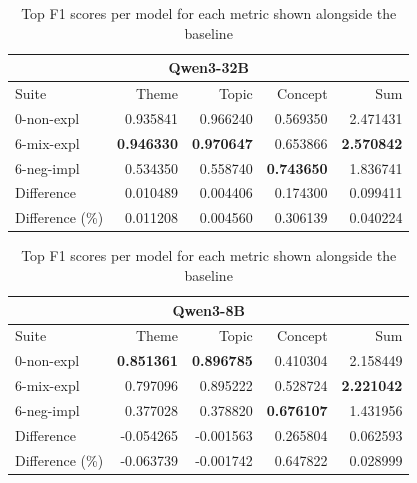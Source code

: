 \begin{table}
    \begin{tabular}{lrrrr}
    \toprule
    \multicolumn{5}{c}{\textbf{Qwen3-32B}} \\
    \midrule
    Suite & Theme & Topic & Concept & Sum \\
    \midrule
    0-non-expl & 0.935841 & 0.966240 & 0.569350 & 2.471431 \\
    6-mix-expl & \bfseries 0.946330 & \bfseries 0.970647 & 0.653866 & \bfseries 2.570842 \\
    6-neg-impl & 0.534350 & 0.558740 & \bfseries 0.743650 & 1.836741 \\
    \midrule
    Difference & 0.010489 & 0.004406 & 0.174300 & 0.099411 \\
    Difference (\%) & 0.011208 & 0.004560 & 0.306139 & 0.040224 \\
    \bottomrule
    \end{tabular}
    \quad
    \begin{tabular}{lrrrr}
    \toprule
    \multicolumn{5}{c}{\textbf{Qwen3-8B}} \\
    \midrule
    Suite & Theme & Topic & Concept & Sum \\
    \midrule
    0-non-expl & \bfseries 0.851361 & \bfseries 0.896785 & 0.410304 & 2.158449 \\
    6-mix-expl & 0.797096 & 0.895222 & 0.528724 & \bfseries 2.221042 \\
    6-neg-impl & 0.377028 & 0.378820 & \bfseries 0.676107 & 1.431956 \\
    \midrule
    Difference & -0.054265 & -0.001563 & 0.265804 & 0.062593 \\
    Difference (\%) & -0.063739 & -0.001742 & 0.647822 & 0.028999 \\
    \bottomrule
    \end{tabular}
                
    \caption{Top F1 scores per model for each metric shown alongside the baseline}
    \label{tab:top_model_scores}
\end{table}